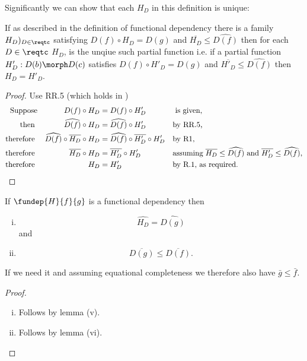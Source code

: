 Significantly we can show that 
each $H_D$ in this definition is unique:
\begin{lemma}
If as described in the definition of functional dependency there is
a family $H_D)_{D \in \reqtc}$
satisfying $D(f) \circ H_D = D(g)$ 
and $\overline{H_D}\leq \widehat{D(f)}$
then for each $D \in \reqtc$ $H_D$, is the unqiue such partial function 
i.e. if  a partial function $H'_D: D(b) \morph D(c)$
satisfies
$D(f) \circ H'_D = D(g)$ and $\overline{H'_D}\leq \widehat{D(f)}$
then $H_D = H'_D$.
\end{lemma}
\begin{proof}
Use RR.5 (which holds in \Par) 
\begin{align*}
\mbox{Suppose}
  &&D(f) \circ H_D 
  &= D(f) \circ H'_D 
  && \mbox{ is given,}\\
\mbox{then }
  &&\widehat{D(f)} \circ H_D 
  &= \widehat{D(f)} \circ H'_D  
  && \mbox{by RR.5,}\\
\mbox{therefore }
  &&\widehat{D(f)} \circ \overline{H_D} \circ H_D 
  &=  \widehat{D(f)} \circ\overline{H'_D} \circ H'_D  
  && \mbox{by R1,}      \\
\mbox{therefore }
  &&\overline{H_D} \circ H_D &=  \overline{H'_D} \circ H'_D  
  && \mbox{\parbox[t]{6cm}{assuming $\overline{H_D}\leq \widehat{D(f)}$ and $\overline{H'_D}\leq \widehat{D(f)}$,}}  \\
\mbox{therefore }
  &&H_D &= H'_D
  && \mbox{by R.1, as required.}
\end{align*}
\end{proof}

\begin{lemma}
If $\fundep{H}{f}{g}$ is a functional dependency then
\begin{enumerate}[(i)]
\item $$\widehat{H_D}=\widehat{D(g)}$$
and
\item $$\overline{D(g)} \leq \overline{D(f)}.$$
\end{enumerate}
\begin{aside}
If we need it and assuming equational completeness we therefore also have
$ \bar{g} \leq \bar{f}$. 
\end{aside}
\end{lemma}
\begin{proof}
\begin{enumerate}[(i)]
\item Follows by lemma  (v).
\item Follows by lemma  (vi).
\end{enumerate}
\end{proof}


